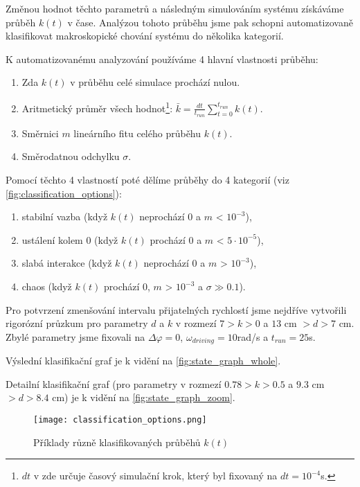 Změnou hodnot těchto parametrů a následným simulováním systému získáváme průběh $k(t)$ v čase. Analýzou tohoto průběhu jsme pak schopni automatizovaně klasifikovat makroskopické chování systému do několika kategorií.

K automatizovanému analyzování používáme 4 hlavní vlastnosti průběhu:
\begin{enumerate}[topsep=0pt, partopsep=0pt]
    \setlength{\itemsep}{0pt}%
    \setlength{\parskip}{0pt}%
    \item Zda $k(t)$ v průběhu celé simulace prochází nulou.
    \item Aritmetický průměr všech hodnot\footnote{$dt$ v zde určuje časový simulační krok, který byl fixovaný na $dt = 10^{-4}$s.}: $\bar{k} = \frac{dt}{t_{run}}\sum_{t=0}^{t_{run}} k(t)$.
    \item Směrnici $m$ lineárního fitu celého průběhu $k(t)$.
    \item Směrodatnou odchylku $\sigma$.
\end{enumerate}

Pomocí těchto 4 vlastností poté dělíme průběhy do 4 kategorií (viz \autoref{fig:classification_options}):

\begin{enumerate}[topsep=0pt, partopsep=0pt]
    \setlength{\itemsep}{0pt}%
    \setlength{\parskip}{0pt}%
    \item stabilní vazba (když $k(t)$ neprochází 0 a $m$ < $10^{-3}$),
    \item ustálení kolem 0 (když $k(t)$ prochází 0 a $m$ < $5\cdot10^{-5}$),
    \item slabá interakce (když $k(t)$ neprochází 0 a $m$ > $10^{-3}$),
    \item chaos (když $k(t)$ prochází 0, $m$ > $10^{-3}$ a $\sigma \gg 0.1$).
\end{enumerate}

Pro potvrzení zmenšování intervalu přijatelných rychlostí jsme nejdříve vytvořili rigorózní průzkum pro parametry $d$ a $k$ v rozmezí $7 > k > 0$ a $13$ cm $> d > 7$ cm. Zbylé parametry jsme fixovali na $\Delta \varphi = 0$, $\omega_{driving} = 10$rad/s a $t_{run} = 25$s.

Výslední klasifikační graf je k vidění na \autoref{fig:state_graph_whole}.

Detailní klasifikační graf (pro parametry v rozmezí $0.78 > k > 0.5$ a $9.3$ cm $> d > 8.4$ cm) je k vidění na \autoref{fig:state_graph_zoom}.

\begin{figure}[H]
    \texttt{[image: classification\_options.png]}
    \centering
    \caption{Příklady různě klasifikovaných průběhů $k(t)$}
    \label{fig:classification_options}
\end{figure}


